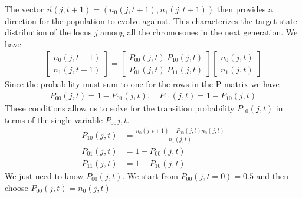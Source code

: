The vector $\vec{n}(j,t+1)=(n_0(j, t+1), n_1(j, t+1))$ then provides a direction for the population to evolve against. This characterizes the target state distribution of the locus $j$ among all the chromosones in the next generation. We have
\begin{align*}
  \begin{bmatrix}
    n_0(j, t+1) \\
    n_1(j, t+1)
  \end{bmatrix}
  = 
  \begin{bmatrix}
    P_{00}(j,t) \ P_{10}(j,t) \\
    P_{01}(j,t) \ P_{11}(j,t)
  \end{bmatrix}
  \begin{bmatrix}
    n_0(j, t) \\
    n_1(j, t)
  \end{bmatrix}
\end{align*}
Since the probability must sum to one for the rows in the P-matrix we have 
\begin{align*}
  P_{00}(j, t) = 1 - P_{01}(j, t), \quad P_{11}(j, t) = 1 - P_{10}(j, t)
\end{align*}
These conditions allow us to solve for the transition probability $P_{10}(j,t)$ in terms of the single variable $P_{00}{j,t}$.
\begin{align*}
  P_{10}(j,t) &= \frac{n_0(j, t+1) - P_{00}(j,t)n_0(j, t)}{n_1(j,t)} \\
  P_{01}(j,t) &= 1 - P_{00}(j,t) \\
  P_{11}(j,t) &= 1 - P_{10}(j,t)
\end{align*}
We just need to know $P_{00}(j,t)$. We start from $P_{00}(j, t = 0) = 0.5$ and then choose $P_{00}(j,t) = n_0(j,t)$